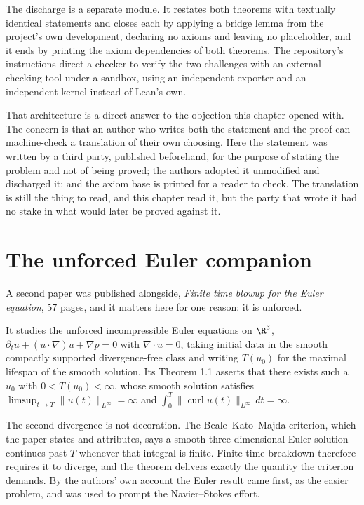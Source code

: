 The discharge is a separate module. It restates both theorems with textually identical statements
and closes each by applying a bridge lemma from the project's own development, declaring no axioms
and leaving no placeholder, and it ends by printing the axiom dependencies of both theorems. The
repository's instructions direct a checker to verify the two challenges with an external checking
tool under a sandbox, using an independent exporter and an independent kernel instead of Lean's
own.

That architecture is a direct answer to the objection this chapter opened with. The concern is that
an author who writes both the statement and the proof can machine-check a translation of their own
choosing. Here the statement was written by a third party, published beforehand, for the purpose of
stating the problem and not of being proved; the authors adopted it unmodified and discharged it;
and the axiom base is printed for a reader to check. The translation is still the thing to read, and
this chapter read it, but the party that wrote it had no stake in what would later be proved
against it.

\section{The unforced Euler companion}

A second paper was published alongside, \emph{Finite time blowup for the Euler equation}, 57 pages,
and it matters here for one reason: it is unforced.

It studies the unforced incompressible Euler equations on $\R^3$, $\partial_t u + (u\cdot\nabla)u +
\nabla p = 0$ with $\nabla\cdot u = 0$, taking initial data in the smooth compactly supported
divergence-free class and writing $T(u_0)$ for the maximal lifespan of the smooth solution. Its
Theorem 1.1 asserts that there exists such a $u_0$ with $0 < T(u_0) < \infty$, whose smooth
solution satisfies $\limsup_{t\to T}\|u(t)\|_{L^\infty} = \infty$ and
$\int_0^T \|\operatorname{curl} u(t)\|_{L^\infty}\,dt = \infty$.

The second divergence is not decoration. The Beale--Kato--Majda criterion, which the paper states
and attributes, says a smooth three-dimensional Euler solution continues past $T$ whenever that
integral is finite. Finite-time breakdown therefore requires it to diverge, and the theorem
delivers exactly the quantity the criterion demands. By the authors' own account the Euler result
came first, as the easier problem, and was used to prompt the Navier--Stokes effort.

